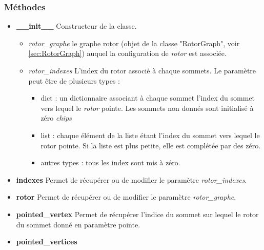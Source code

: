\documentclass{article}
\begin{document}
            \subsubsection{Méthodes}
                \begin{itemize}
                    \item \textbf{\_\_init\_\_}\newline
                    Constructeur de la classe.
                    \begin{itemize}
                        \item \textit{rotor\_graphe}\newline
                        le graphe rotor (objet de la classe "RotorGraph", voir \ref{sec:RotorGraph}) auquel la configuration de \textit{rotor} est associée.
                        \item \textit{rotor\_indexes}\newline
                        L'index du rotor associé à chaque sommets. Le paramètre peut être de plusieurs types :
                        \begin{itemize}
                            \item dict : un dictionnaire associant à chaque sommet l'index du sommet vers lequel le \textit{rotor} pointe. Les sommets non donnés sont initialisé à zéro \textit{chips}
                            \item list : chaque élément de la liste étant l'index du sommet vers lequel le rotor pointe. Si la liste est plus petite, elle est complétée par des zéro.
                            \item autres types : tous les index sont mis à zéro.
                        \end{itemize}
                    \end{itemize}
                    \item \textbf{indexes}\newline
                    Permet de récupérer ou de modifier le paramètre \textit{rotor\_indexes}.
                    \item \textbf{rotor}\newline
                    Permet de récupérer ou de modifier le paramètre \textit{rotor\_graphe}.
                    \item \textbf{pointed\_vertex}\newline
                    Permet de récupérer l'indice du sommet sur lequel le rotor du sommet donné en paramètre pointe.
                    \item \textbf{pointed\_vertices}\newline

\end{itemize}
\end{document}
